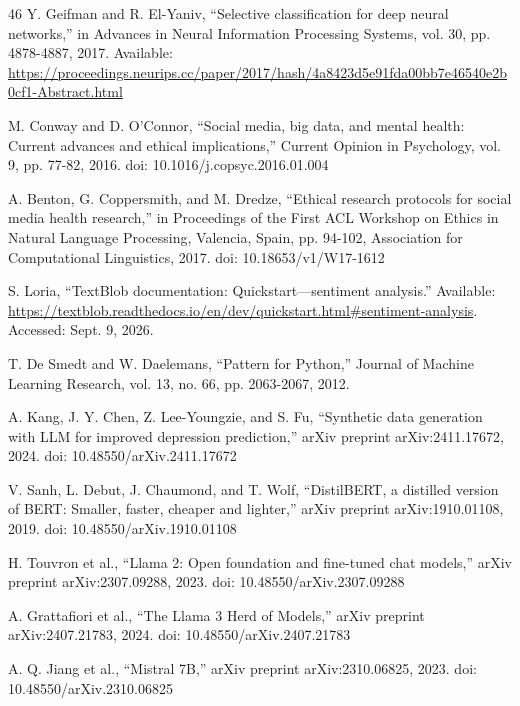 \documentclass{ieeeaccess}
\begin{document}
\begin{thebibliography}{46}
 Y. Geifman and R. El-Yaniv, ``Selective classification for deep neural networks,'' in Advances in Neural Information Processing Systems, vol. 30, pp. 4878-4887, 2017. Available: \url{https://proceedings.neurips.cc/paper/2017/hash/4a8423d5e91fda00bb7e46540e2b0cf1-Abstract.html}

 M. Conway and D. O'Connor, ``Social media, big data, and mental health: Current advances and ethical implications,'' Current Opinion in Psychology, vol. 9, pp. 77-82, 2016. doi: 10.1016/j.copsyc.2016.01.004

 A. Benton, G. Coppersmith, and M. Dredze, ``Ethical research protocols for social media health research,'' in Proceedings of the First ACL Workshop on Ethics in Natural Language Processing, Valencia, Spain, pp. 94-102, Association for Computational Linguistics, 2017. doi: 10.18653/v1/W17-1612

 S. Loria, ``TextBlob documentation: Quickstart---sentiment analysis.'' Available: \url{https://textblob.readthedocs.io/en/dev/quickstart.html#sentiment-analysis}. Accessed: Sept. 9, 2026.

 T. De Smedt and W. Daelemans, ``Pattern for Python,'' Journal of Machine Learning Research, vol. 13, no. 66, pp. 2063-2067, 2012.

 A. Kang, J. Y. Chen, Z. Lee-Youngzie, and S. Fu, ``Synthetic data generation with LLM for improved depression prediction,'' arXiv preprint arXiv:2411.17672, 2024. doi: 10.48550/arXiv.2411.17672

 V. Sanh, L. Debut, J. Chaumond, and T. Wolf, ``DistilBERT, a distilled version of BERT: Smaller, faster, cheaper and lighter,'' arXiv preprint arXiv:1910.01108, 2019. doi: 10.48550/arXiv.1910.01108

 H. Touvron et al., ``Llama 2: Open foundation and fine-tuned chat models,'' arXiv preprint arXiv:2307.09288, 2023. doi: 10.48550/arXiv.2307.09288

 A. Grattafiori et al., ``The Llama 3 Herd of Models,'' arXiv preprint arXiv:2407.21783, 2024. doi: 10.48550/arXiv.2407.21783

 A. Q. Jiang et al., ``Mistral 7B,'' arXiv preprint arXiv:2310.06825, 2023. doi: 10.48550/arXiv.2310.06825
\end{thebibliography}

\clearpage
\onecolumn\raggedbottom
\appendices
\setlength{\medskipamount}{4pt plus 1pt minus 1pt}
\end{document}
